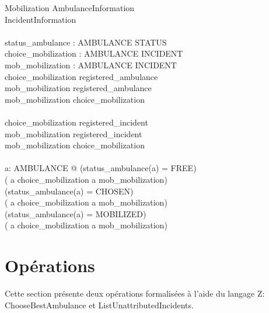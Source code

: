 \documentclass{report}
\begin{document}
\begin{schema}{Mobilization}
	AmbulanceInformation \\
	IncidentInformation \\
	\newline \\
	status\_ambulance : AMBULANCE \pfun STATUS \\
	choice\_mobilization : AMBULANCE \pinj INCIDENT \\
	mob\_mobilization : AMBULANCE \pinj INCIDENT \\
  \where
  	\dom choice\_mobilization \subseteq registered\_ambulance \\
	\dom mob\_mobilization \subseteq registered\_ambulance \\
	\dom mob\_mobilization  \subseteq \dom choice\_mobilization \\
	\newline \\
	\ran choice\_mobilization \subseteq registered\_incident \\
	\ran mob\_mobilization \subseteq registered\_incident \\
	\ran mob\_mobilization  \subseteq \ran choice\_mobilization \\
	\newline \\
	\forall a: AMBULANCE @ 
			(status\_ambulance(a) = FREE) \equiv \\
	                        ( a \notin \dom choice\_mobilization \land a \notin \dom mob\_mobilization) \\
	                   \land
	                   (status\_ambulance(a) = CHOSEN) \equiv \\
	                        ( a \in \dom choice\_mobilization \land a \notin \dom mob\_mobilization) \\
	                     \land
	                   (status\_ambulance(a) = MOBILIZED) \equiv \\
	                        ( a \in \dom choice\_mobilization \land a \in \dom mob\_mobilization) \\
  	
\end{schema}

\section{Opérations}\label{sec:op}

Cette section présente deux opérations formalisées à l'aide du langage Z:
ChooseBestAmbulance et ListUnattributedIncidents.
\end{document}
